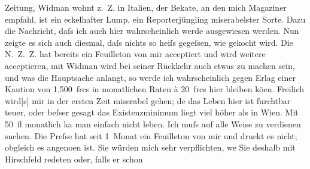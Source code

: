 \begin{ledgroupsized}[t]{13cm}
                        Zeitung, Widman wohnt z. Z. in
                    Italien, der Beka{\geminationn}te, an den mich Magaziner empfahl, ist ein eckelhafter Lump, ein
                    Reporterjüngling miserabelster Sorte. Dazu die Nachricht, daſs ich auch hier
                    wahrscheinlich werde ausgewiesen werden. Nun zeigte es sich auch diesmal, daſs
                    nichts so heiſs gegeſsen, wie gekocht wird. Die N. Z. Z. hat bereits ein Feuilleton von mir acceptiert und wird
                    weitere acceptieren, mit Widman wird bei
                    seiner Rückkehr auch etwas zu machen sein, und was die Hauptsache anlangt, so
                    werde ich wahrscheinlich gegen Erlag einer Kaution von 1,500 frcs in monatlichen
                    Raten à 20 frcs hier bleiben kö{\geminationn}en. Freilich
                    wird{[}s{]} mir in {\pb}der ersten Zeit miserabel gehen; de{\geminationn} das Leben
                    hier ist furchtbar teuer, oder beſser gesagt das Existenzminimum liegt viel
                    höher als in Wien. Mit 50 fl monatlich ka{\geminationn} man einfach nicht leben. Ich muſs auf alle Weise
                    zu verdienen suchen. Die Preſse hat seit
                    1 Monat ein Feuilleton von
                    mir und druckt es nicht; obgleich es angeno{\geminationm}en ist.
                    Sie würden mich sehr verpflichten, we{\geminationn} Sie deshalb
                    mit Hirschfeld redeten oder, falls er schon

\end{ledgroupsized}
